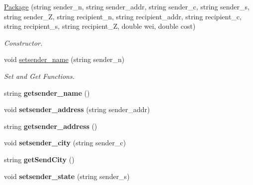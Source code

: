 \begin{DoxyCompactItemize}
\item 
\mbox{\hyperlink{class_package_a3b3ccbce09176e6c7acb16906bfe0fce}{Package}} (string sender\+\_\+n, string sender\+\_\+addr, string sender\+\_\+c, string sender\+\_\+s, string sender\+\_\+Z, string recipient\+\_\+n, string recipient\+\_\+addr, string recipient\+\_\+c, string recipient\+\_\+s, string recipient\+\_\+Z, double wei, double cost)
\begin{DoxyCompactList}\small\item\em Constructor. \end{DoxyCompactList}\item 
\mbox{\label{class_package_ace5577424f5b709217608398dc31996a}} 
void \mbox{\hyperlink{class_package_ace5577424f5b709217608398dc31996a}{setsender\+\_\+name}} (string sender\+\_\+n)
\begin{DoxyCompactList}\small\item\em Set and Get Functions. \end{DoxyCompactList}\item 
\mbox{\label{class_package_aeb55d6547f28f2a4577ebf0be55b816a}} 
string {\bfseries getsender\+\_\+name} ()
\item 
\mbox{\label{class_package_a6bb1b20a876a8212a2bf8ff998d866a9}} 
void {\bfseries setsender\+\_\+address} (string sender\+\_\+addr)
\item 
\mbox{\label{class_package_adf5ce398435f90bec468d87e31fe1d6a}} 
string {\bfseries getsender\+\_\+address} ()
\item 
\mbox{\label{class_package_a6f0b8f51e6d72bfa3c5b2d9579b3dc3f}} 
void {\bfseries setsender\+\_\+city} (string sender\+\_\+c)
\item 
\mbox{\label{class_package_a539fc1afbd3c07c1347974d1e90a323c}} 
string {\bfseries get\+Send\+City} ()
\item 
\mbox{\label{class_package_a63208941e737271d156e8489c298d6cc}} 
void {\bfseries setsender\+\_\+state} (string sender\+\_\+s)
\item 
\mbox{\label{class_package_a09627c4b99dfb508a92c884f4f7547b7}} 

\end{DoxyCompactItemize}
